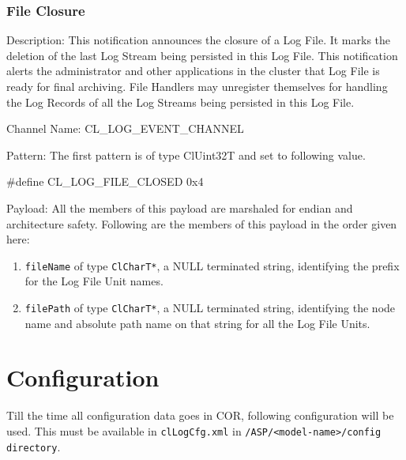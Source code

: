 \begin{flushleft}
\subsection{File Closure}
\begin{Desc}
\item[Description:]
This notification announces the closure of a Log File. It marks the deletion of the last Log Stream being persisted in this Log File. This notification
alerts the administrator and other applications in the cluster that Log File is ready for final archiving. File Handlers may unregister themselves for 
handling the Log Records of all the Log Streams being persisted in this Log File.
\end{Desc}
\begin{Desc}
\item[Channel Name:]
CL\_\-LOG\_\-EVENT\_\-CHANNEL
\end{Desc}
\begin{Desc}
\item[Pattern:]
The first pattern is of type ClUint32T and set to following value.\par
\#define CL\_\-LOG\_\-FILE\_\-CLOSED	0x4
\end{Desc}
\begin{Desc}
\item[Payload:]
All the members of this payload are marshaled for endian and architecture safety. Following are the members of this payload in the order given here:
\begin{enumerate}
\item
{\tt{fileName}} of type {\tt{ClCharT*}}, a NULL terminated string, identifying the prefix for the Log File Unit names.
\item
{\tt{filePath}} of type {\tt{ClCharT*}}, a NULL terminated string, identifying the node name and absolute path name on that string for all the Log File
Units.
\end{enumerate}
\end{Desc}

\chapter{Configuration}

Till the time all configuration data goes in COR, following configuration will be used. This must be available in {\tt{clLogCfg.xml}} in
{\tt{/ASP/<model-name>/config directory}}.
\footnotesize\begin{verbatim}        	


\end{verbatim}
\end{flushleft}
